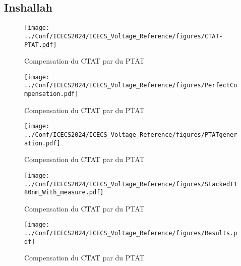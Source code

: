 \subsection{Inshallah}
\begin{figure}
    \centering
    \texttt{[image: ../Conf/ICECS2024/ICECS\_Voltage\_Reference/figures/CTAT-PTAT.pdf]}
    \caption{Compensation du CTAT par du PTAT}
    \label{fig:CTAT_PTAT_insh}
\end{figure}
\begin{figure}
    \centering
    \texttt{[image: ../Conf/ICECS2024/ICECS\_Voltage\_Reference/figures/PerfectCompensation.pdf]}
    \caption{Compensation du CTAT par du PTAT}
    \label{fig:PerfectCompensation}
\end{figure}
\begin{figure}
    \centering
    \texttt{[image: ../Conf/ICECS2024/ICECS\_Voltage\_Reference/figures/PTATgeneration.pdf]}
    \caption{Compensation du CTAT par du PTAT}
    \label{fig:PTATgeneration}
\end{figure}
\begin{figure}
    \centering
    \texttt{[image: ../Conf/ICECS2024/ICECS\_Voltage\_Reference/figures/StackedT180nm\_With\_measure.pdf]}
    \caption{Compensation du CTAT par du PTAT}
    \label{fig:StackedT180nm_With_measure}
\end{figure}
\begin{figure}
    \centering
    \texttt{[image: ../Conf/ICECS2024/ICECS\_Voltage\_Reference/figures/Results.pdf]}
    \caption{Compensation du CTAT par du PTAT}
    \label{fig:ResultsICECS2024}
\end{figure}
